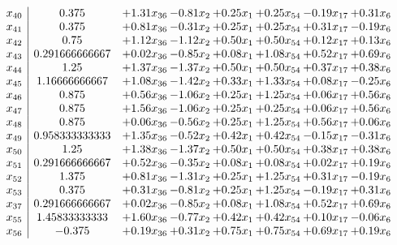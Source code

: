 \documentclass[8pt]{article}
\begin{document}
\[\begin{array}{c| c c@{\hskip 2pt} c@{\hskip 2pt} c@{\hskip 2pt} c@{\hskip 2pt} c@{\hskip 2pt} c@{\hskip 2pt} }
 x_{40}   &  0.375 & +  1.31 x_{36} & -0.81 x_{2} & +  0.25 x_{1} & +  0.25 x_{54} & -0.19 x_{17} & +  0.31 x_{6}\\
 x_{41}   &  0.375 & +  0.81 x_{36} & -0.31 x_{2} & +  0.25 x_{1} & +  0.25 x_{54} & +  0.31 x_{17} & -0.19 x_{6}\\
 x_{42}   &  0.75 & +  1.12 x_{36} & -1.12 x_{2} & +  0.50 x_{1} & +  0.50 x_{54} & +  0.12 x_{17} & +  0.13 x_{6}\\
 x_{43}   &  0.291666666667 & +  0.02 x_{36} & -0.85 x_{2} & +  0.08 x_{1} & +  1.08 x_{54} & +  0.52 x_{17} & +  0.69 x_{6}\\
 x_{44}   &  1.25 & +  1.37 x_{36} & -1.37 x_{2} & +  0.50 x_{1} & +  0.50 x_{54} & +  0.37 x_{17} & +  0.38 x_{6}\\
 x_{45}   &  1.16666666667 & +  1.08 x_{36} & -1.42 x_{2} & +  0.33 x_{1} & +  1.33 x_{54} & +  0.08 x_{17} & -0.25 x_{6}\\
 x_{46}   &  0.875 & +  0.56 x_{36} & -1.06 x_{2} & +  0.25 x_{1} & +  1.25 x_{54} & +  0.06 x_{17} & +  0.56 x_{6}\\
 x_{47}   &  0.875 & +  1.56 x_{36} & -1.06 x_{2} & +  0.25 x_{1} & +  0.25 x_{54} & +  0.06 x_{17} & +  0.56 x_{6}\\
 x_{48}   &  0.875 & +  0.06 x_{36} & -0.56 x_{2} & +  0.25 x_{1} & +  1.25 x_{54} & +  0.56 x_{17} & +  0.06 x_{6}\\
 x_{49}   &  0.958333333333 & +  1.35 x_{36} & -0.52 x_{2} & +  0.42 x_{1} & +  0.42 x_{54} & -0.15 x_{17} & -0.31 x_{6}\\
 x_{50}   &  1.25 & +  1.38 x_{36} & -1.37 x_{2} & +  0.50 x_{1} & +  0.50 x_{54} & +  0.38 x_{17} & +  0.38 x_{6}\\
 x_{51}   &  0.291666666667 & +  0.52 x_{36} & -0.35 x_{2} & +  0.08 x_{1} & +  0.08 x_{54} & +  0.02 x_{17} & +  0.19 x_{6}\\
 x_{52}   &  1.375 & +  0.81 x_{36} & -1.31 x_{2} & +  0.25 x_{1} & +  1.25 x_{54} & +  0.31 x_{17} & -0.19 x_{6}\\
 x_{53}   &  0.375 & +  0.31 x_{36} & -0.81 x_{2} & +  0.25 x_{1} & +  1.25 x_{54} & -0.19 x_{17} & +  0.31 x_{6}\\
 x_{37}   &  0.291666666667 & +  0.02 x_{36} & -0.85 x_{2} & +  0.08 x_{1} & +  1.08 x_{54} & +  0.52 x_{17} & +  0.69 x_{6}\\
 x_{55}   &  1.45833333333 & +  1.60 x_{36} & -0.77 x_{2} & +  0.42 x_{1} & +  0.42 x_{54} & +  0.10 x_{17} & -0.06 x_{6}\\
 x_{56}   &  -0.375 & +  0.19 x_{36} & +  0.31 x_{2} & +  0.75 x_{1} & +  0.75 x_{54} & +  0.69 x_{17} & +  0.19 x_{6}\\

\end{array}\]
\end{document}
